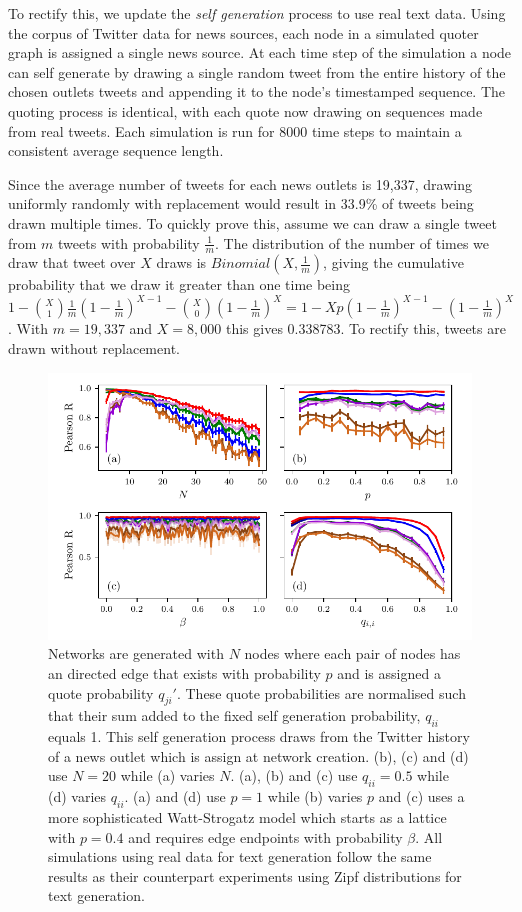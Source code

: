 To rectify this, we update the \emph{self generation} process to use real text data. Using the corpus of Twitter data for news sources, each node in a simulated quoter graph is assigned a single news source. At each time step of the simulation a node can self generate by drawing a single random tweet from the entire history of the chosen outlets tweets and appending it to the node's timestamped sequence. The quoting process is identical, with each quote now drawing on sequences made from real tweets. Each simulation is run for 8000 time steps to maintain a consistent average sequence length. 

Since the average number of tweets for each news outlets is 19,337, drawing uniformly randomly with replacement would result in 33.9\% of tweets being drawn multiple times. To quickly prove this, assume we can draw a single tweet from $m$ tweets with probability $\frac{1}{m}$. The distribution of the number of times we draw that tweet over $X$ draws is $Binomial(X, \frac{1}{m})$, giving the cumulative probability that we draw it greater than one time being $1-\binom{X}{1} \frac{1}{m}(1-\frac{1}{m})^{X-1} - \binom{X}{0} (1-\frac{1}{m})^X = 1- Xp(1-\frac{1}{m})^{X-1} - (1-\frac{1}{m})^X$. With $m=19,337$ and $X=8,000$ this gives 0.338783. To rectify this, tweets are drawn without replacement. 

\begin{figure}[!htbp]
	\centering
	\includegraphics{./chapter3/figs/real_data_simulations.pdf}
	\caption{Networks are generated with $N$ nodes where each pair of nodes has an directed edge that exists with probability $p$ and is assigned a quote probability $q_{ji}'$. These quote probabilities are normalised such that their sum added to the fixed self generation probability, $q_{ii}$ equals 1. This self generation process draws from the Twitter history of a news outlet which is assign at network creation. (b), (c) and (d) use $N=20$ while (a) varies $N$. (a), (b) and (c) use $q_{ii}=0.5$ while (d) varies $q_{ii}$.  (a) and (d) use $p=1$ while (b) varies $p$ and (c) uses a more sophisticated Watt-Strogatz model which starts as a lattice with $p=0.4$ and requires edge endpoints with probability $\beta$. All simulations using real data for text generation follow the same results as their counterpart experiments using Zipf distributions for text generation.}
	\label{fig:flow_realdataquotermodel}
\end{figure}

